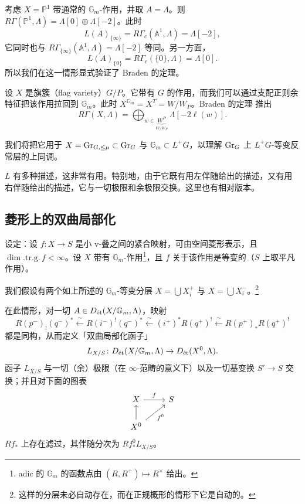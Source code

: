 \begin{example}
考虑 $X=\mathbb{P}^1$ 带通常的 $\mathbb{G}_m$-作用，并取 $A=\Lambda$。则 $R\Gamma(\mathbb{P}^1,\Lambda)=\Lambda[0]\oplus\Lambda[-2]$。此时
\[
L(A)_{\{\infty\}}=R\Gamma_c(\mathbb{A}^1,\Lambda)=\Lambda[-2],
\]
它同时也与 $R\Gamma_{\{\infty\}}(\mathbb{A}^1,\Lambda)=\Lambda[-2]$ 等同。另一方面，
\[
L(A)_{\{0\}}=R\Gamma_c(\{0\},\Lambda)=\Lambda[0].
\]
所以我们在这一情形显式验证了 Braden 的定理。
\end{example}

\begin{example}
设 $X$ 是旗簇（flag variety）$G/P$。它带有 $G$ 的作用，而我们可以通过支配正则余特征把该作用拉回到 $\mathbb{G}_m$。此时 $X^{\mathbb{G}_m}=X^T=W/W_P$。Braden 的定理 推出
\[
R\Gamma(X,\Lambda)=\bigoplus_{w\in\underbrace{W^P}_{W/W_P}}\Lambda[-2\ell(w)].
\]
\end{example}

我们将把它用于 $X=\Gr_{G,\le\mu}\subset\Gr_G$ 与 $\mathbb{G}_m\subset L^+G$，以理解 $\Gr_G$ 上 $L^+G$-等变反常层的上同调。

\begin{remark}
$L$ 有多种描述，这非常有用。特别地，由于它既有用左伴随给出的描述，又有用右伴随给出的描述，它与一切极限和余极限交换。这里也有相对版本。
\end{remark}

\subsection{菱形上的双曲局部化}

设定：设 $f\colon X\to S$ 是小 v-叠之间的紧合映射，可由空间菱形表示，且 $\dim.\mathrm{tr.g.}\,f<\infty$。设 $X$ 带有 $\mathbb{G}_m$-作用\footnote{adic 的 $\mathbb{G}_m$ 的函数点由 $(R,R^+)\mapsto R^\times$ 给出。}，且 $f$ 关于该作用是等变的（$S$ 上取平凡作用）。

我们假设有两个如上所述的 $\mathbb{G}_m$-等变分层 $X=\bigcup X^+_i$ 与 $X=\bigcup X^-_i$。\footnote{这样的分层未必自动存在，而在正规概形的情形下它是自动的。}

\begin{theorem}
在此情形，对一切 $A\in D_\et(X/\mathbb{G}_m,\Lambda)$，映射
\[
R(p^-)_!(q^-)^*\xleftarrow{\ \sim\ }R(i^-)^!(q^-)^*\xleftarrow{\ \sim\ }(i^+)^*R(q^+)^!\xleftarrow{\ \sim\ }R(p^+)_*R(q^+)^!
\]
都是同构，从而定义「双曲局部化函子」
\[
L_{X/S}\colon D_\et(X/\mathbb{G}_m,\Lambda)\to D_\et(X^0,\Lambda).
\]
函子 $L_{X/S}$ 与一切（余）极限（在 $\infty$-范畴的意义下）以及一切基变换 $S'\to S$ 交换；并且对下面的图表
\[
\begin{tikzcd}
X \arrow[r, "f"] & S \\
X^0 \arrow[u] \arrow[ur, "f^0"'] &
\end{tikzcd}
\]
$Rf_*$ 上存在滤过，其伴随分次为 $Rf^0_*L_{X/S}$。
\end{theorem}

